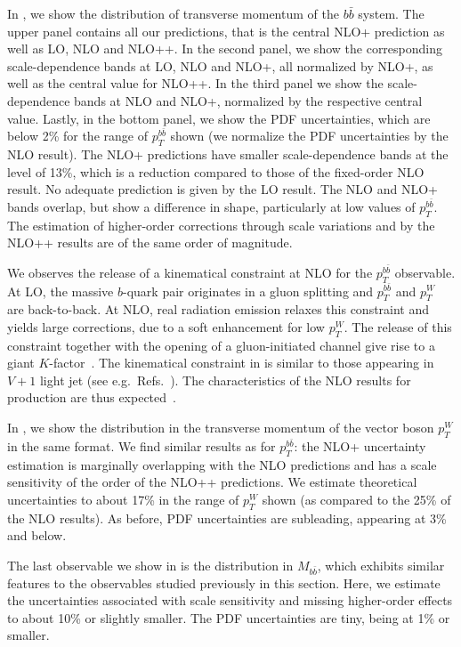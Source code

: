 In , we show the distribution of transverse momentum of
the $b\bar b$ system. The upper panel contains all our predictions, that is the central
NLO+ prediction as well as LO, NLO and NLO++. In the second panel, we
show the corresponding scale-dependence bands at LO, NLO and NLO+, all normalized by NLO+, as well as the central value for
NLO++. In the third panel we show the scale-dependence bands at
NLO and NLO+, normalized by the respective central value. Lastly, in
the bottom panel, we show the PDF uncertainties, which are below
2\% for the range of $p_T^{b\bar b}$ shown (we normalize the PDF
uncertainties by the NLO result). The NLO+ predictions have smaller scale-dependence bands at the level
of 13\%, which is a reduction compared to those of the fixed-order
NLO result. No adequate prediction is given by the LO result. The NLO
and NLO+ bands overlap, but show a difference in shape, particularly
at low values of $p_T^{b\bar b}$. The estimation of higher-order corrections through scale variations and by the NLO++
results are of the same order of magnitude.



We observes the release of a kinematical constraint at NLO for the
$p_T^{b\bar b}$ observable. At LO, the massive $b$-quark pair
originates in a gluon splitting and $p_T^{b\bar b}$ and
$p_T^W$ are back-to-back. At NLO, real radiation emission relaxes this
constraint and yields large corrections, due to a soft enhancement for low $p_T^W$. The release of this constraint together with the opening of a gluon-initiated channel give rise to a giant $K$-factor~\cite{Rubin:2010xp}. The kinematical constraint in \Wbb{} is
similar to those appearing in $V+1$ light jet (see e.g.\ Refs.~\cite{BH:W3jPRL,BH:W4j,BH:W5j}). The characteristics of
the NLO results for \Wbb{} production are thus expected~\cite{Catani:1997xc}.


In , we show the distribution in the transverse
momentum of the vector boson $p_T^W$ in the same format. We find similar results as for $p_T^{b\bar b}$: the NLO+ uncertainty
estimation is marginally
overlapping with the NLO predictions and has a scale sensitivity of the order
of the NLO++ predictions. We estimate theoretical uncertainties to about 17\% in the
range of $p_T^W$ shown (as compared to the 25\% of the NLO
results). As before, PDF uncertainties are
subleading, appearing at 3\% and below.

The last observable we show in  is the distribution in $M_{b\bar b}$, which exhibits similar features to the observables
studied previously in this section. Here, we estimate the uncertainties associated with scale
sensitivity and missing higher-order effects to about 10\% or slightly
smaller. The PDF uncertainties are tiny, being at 1\% or smaller. 



